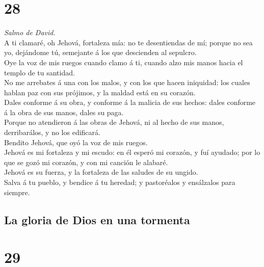 \hypertarget{section-27}{%
\section{28}\label{section-27}}

 \emph{Salmo de David.}\\
A ti clamaré, oh Jehová, fortaleza mía: no te desentiendas de mí; porque
no sea yo, dejándome tú, semejante á los que descienden al sepulcro.\\
 Oye la voz de mis ruegos cuando clamo á ti, cuando alzo mis
manos hacia el templo de tu santidad.\\
 No me arrebates á una con los malos, y con los que hacen
iniquidad: los cuales hablan paz con sus prójimos, y la maldad está en
su corazón.\\
 Dales conforme á su obra, y conforme á la malicia de sus
hechos: dales conforme á la obra de sus manos, dales su paga.\\
 Porque no atendieron á las obras de Jehová, ni al hecho de
sus manos, derribarálos, y no los edificará.\\
 Bendito Jehová, que oyó la voz de mis ruegos.\\
 Jehová es mi fortaleza y mi escudo: en él esperó mi
corazón, y fuí ayudado; por lo que se gozó mi corazón, y con mi canción
le alabaré.\\
 Jehová es su fuerza, y la fortaleza de las saludes de su
ungido.\\
 Salva á tu pueblo, y bendice á tu heredad; y pastoréalos y
ensálzalos para siempre.

\hypertarget{la-gloria-de-dios-en-una-tormenta}{%
\subsection{La gloria de Dios en una
tormenta}\label{la-gloria-de-dios-en-una-tormenta}}

\hypertarget{section-28}{%
\section{29}\label{section-28}}

